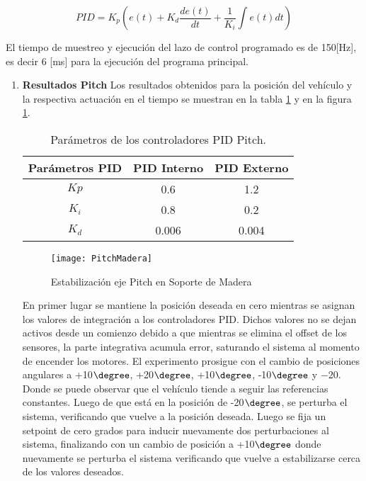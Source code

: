 \documentclass[\main/main.tex]{subfiles}
\begin{document}
\begin{equation}
PID=K_{p}(e(t)+K_{d}\frac{de(t)}{dt}+\frac{1}{K_{i}}\int e(t)dt)
\end{equation}

El tiempo de muestreo y ejecución del lazo de control programado es de 150[Hz], es decir 6 [ms] para la ejecución del programa principal. 

\begin{enumerate}
	\item \textbf{Resultados Pitch}
	Los resultados obtenidos para la posición del vehículo y la respectiva
	actuación en el tiempo se muestran en la tabla \ref{table: Parametros Pitch Ma} y en la figura \ref{fig: Resultado Pitch Grafico Ma}.

	\begin{table}[H]
	\noindent \begin{centering}
	\begin{tabular}{|c|c|c|}
	\hline 
	Parámetros PID & PID Interno & PID Externo\tabularnewline
	\hline 
	\hline 
	$Kp$ & 0.6 & 1.2\tabularnewline
	\hline 
	$K_{i}$ & 0.8 & 0.2\tabularnewline
	\hline 
	$K_{d}$ & 0.006 & 0.004\tabularnewline
	\hline 
	\end{tabular}
	\par\end{centering}
	\caption{Parámetros de los controladores PID Pitch.}\label{table: Parametros Pitch Ma}\noindent
	\end{table}

	\begin{figure}[H]
	\noindent \begin{centering}
	\texttt{[image: PitchMadera]}
	\par\end{centering}
	\caption{Estabilización eje Pitch en Soporte de Madera}\label{fig: Resultado Pitch Grafico Ma}\noindent
	\end{figure}

	En primer lugar se mantiene la posición deseada en cero mientras se
	asignan los valores de integración a los controladores PID. Dichos
	valores no se dejan activos desde un comienzo debido a que mientras
	se elimina el offset de los sensores, la parte integrativa acumula
	error, saturando el sistema al momento de encender los motores. El
	experimento prosigue con el cambio de posiciones angulares a +10$\degree$,
	+20$\degree$, +10$\degree$, -10$\degree$
	y $-20$. Donde se puede observar que el vehículo tiende a seguir
	las referencias constantes. Luego de que está en la posición de -20$\degree$,
	se perturba el sistema, verificando que vuelve a la posición deseada.
	Luego se fija un setpoint de cero grados para inducir nuevamente dos
	perturbaciones al sistema, finalizando con un cambio de posición a
	+10$\degree$ donde nuevamente se perturba el sistema verificando
	que vuelve a estabilizarse cerca de los valores deseados.


\end{enumerate}
\end{document}
